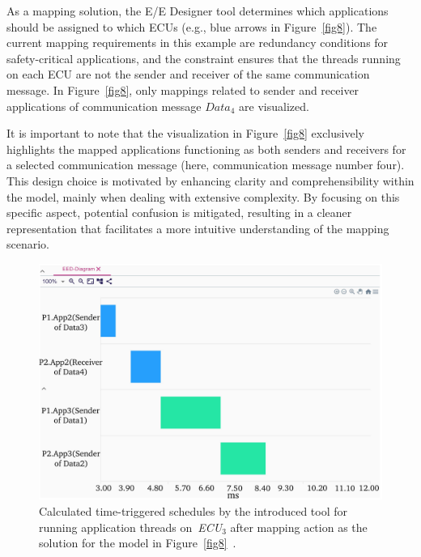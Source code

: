         
        
        As a mapping solution, the E/E Designer tool determines which applications should be assigned to which ECUs (e.g., blue arrows in Figure~\ref{fig8}). The current mapping requirements in this example are redundancy conditions for safety-critical applications, and the constraint ensures that the threads running on each ECU are not the sender and receiver of the same communication message. In Figure~\ref{fig8}, only mappings related to sender and receiver applications of communication message $Data_4$ are visualized.
        
        It is important to note that the visualization in Figure~\ref{fig8} exclusively highlights the mapped applications functioning as both senders and receivers for a selected communication message (here, communication message number four). This design choice is motivated by enhancing clarity and comprehensibility within the model, mainly when dealing with extensive complexity. By focusing on this specific aspect, potential confusion is mitigated, resulting in a cleaner representation that facilitates a more intuitive understanding of the mapping scenario.
      
          \begin{figure}[ht]
    	\centering
    	\includegraphics[width=0.85\columnwidth]{figures/schedule_new.pdf}
    	\caption{Calculated time-triggered schedules by the introduced tool for running application threads on~\textit{ECU$_3$} after mapping action as the solution for the model in Figure~\ref{fig8}~\cite{askaripoor2023designer}.}
    	\label{fig9}
        \end{figure}  
